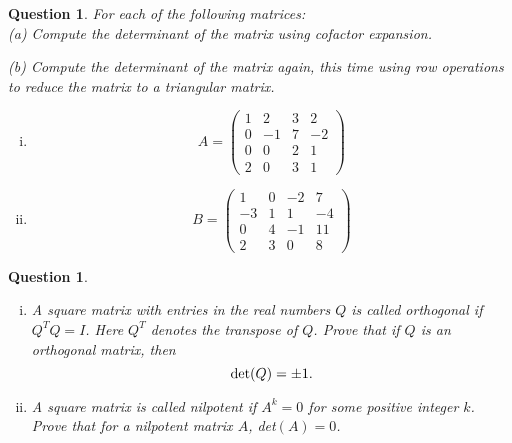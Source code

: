 \documentclass[12pt]{article}
\newtheorem{question}[thm]{Question}
\begin{document}
\begin{question}

\normalfont
For each of the following matrices: \\

\noindent (a) Compute the determinant of the matrix using cofactor expansion. 

\noindent (b) Compute the determinant of the matrix again, this time using row operations to reduce the matrix to a triangular matrix. \\

\begin{enumerate}[(i)]
\item
\[
A= \begin{pmatrix}
			1 & 2 & 3 & 2\\
			0 & -1 & 7 & -2\\
			0 & 0 & 2 & 1\\
			2 & 0 & 3 & 1	
		\end{pmatrix}
\]
\item
\[
B= \begin{pmatrix}
			1 & 0 & -2 & 7\\
			-3 & 1 & 1 & -4\\
			0 & 4 & -1 & 11\\
			2 & 3 & 0 & 8	
		\end{pmatrix}
\]

\end{enumerate}
\end{question}
\vspace{1cm}


\begin{question}
	\normalfont 
	\begin{enumerate}[(i)]
	
	\item A square matrix with entries in the real numbers $Q$ is called \emph{orthogonal} if $Q^TQ = I$. Here $Q^T$ denotes the transpose of $Q$. Prove that if $Q$ is an orthogonal matrix, then 
	\[
	\textup{det}(Q) = \pm 1. 
	\]
	
	\item A square matrix is called \emph{nilpotent} if $A^k =0$ for some positive integer $k$. Prove that for a nilpotent matrix $A$, det$(A)=0$. 
	
	
	
	
	\end{enumerate}
	\end{question}



\vspace{1cm}
\end{document}
